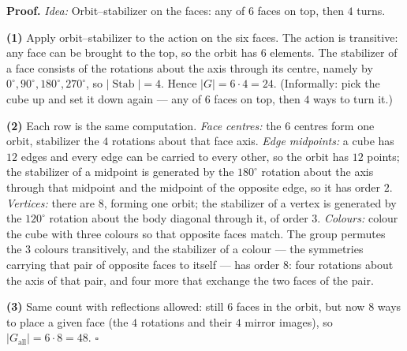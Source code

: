 \documentclass[11pt]{report}
\renewenvironment{proof}[1][Proof]{\noindent\textbf{#1.} }{\hfill$\square$\par\vspace{5pt}}
\begin{document}
\begin{proof}
\textit{Idea:} Orbit--stabilizer on the faces: any of $6$ faces on top, then $4$ turns.\par
\textbf{(1)} Apply orbit--stabilizer to the action on the six faces. The action is transitive: any face can be brought to the top, so the orbit has $6$ elements. The stabilizer of a face consists of the rotations about the axis through its centre, namely by $0^\circ, 90^\circ, 180^\circ, 270^\circ$, so $|\operatorname{Stab}| = 4$. Hence $|G| = 6 \cdot 4 = 24$. (Informally: pick the cube up and set it down again --- any of $6$ faces on top, then $4$ ways to turn it.)

\textbf{(2)} Each row is the same computation.
\emph{Face centres:} the $6$ centres form one orbit, stabilizer the $4$ rotations about that face axis.
\emph{Edge midpoints:} a cube has $12$ edges and every edge can be carried to every other, so the orbit has $12$ points; the stabilizer of a midpoint is generated by the $180^\circ$ rotation about the axis through that midpoint and the midpoint of the opposite edge, so it has order $2$.
\emph{Vertices:} there are $8$, forming one orbit; the stabilizer of a vertex is generated by the $120^\circ$ rotation about the body diagonal through it, of order $3$.
\emph{Colours:} colour the cube with three colours so that opposite faces match. The group permutes the $3$ colours transitively, and the stabilizer of a colour --- the symmetries carrying that pair of opposite faces to itself --- has order $8$: four rotations about the axis of that pair, and four more that exchange the two faces of the pair.

\textbf{(3)} Same count with reflections allowed: still $6$ faces in the orbit, but now $8$ ways to place a given face (the $4$ rotations and their $4$ mirror images), so $|G_{\mathrm{all}}| = 6 \cdot 8 = 48$.
\end{proof}
\end{document}
